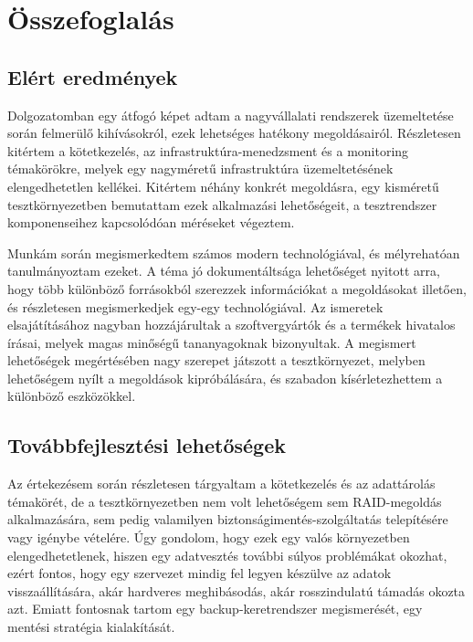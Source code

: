 
\chapter{Összefoglalás}

\section{Elért eredmények}
Dolgozatomban egy átfogó képet adtam a nagyvállalati rendszerek üzemeltetése során felmerülő kihívásokról, ezek lehetséges hatékony megoldásairól. Részletesen kitértem a kötetkezelés, az infrastruktúra-menedzsment és a monitoring témakörökre, melyek egy nagyméretű infrastruktúra üzemeltetésének elengedhetetlen kellékei. Kitértem néhány konkrét megoldásra, egy kisméretű tesztkörnyezetben bemutattam ezek alkalmazási lehetőségeit, a tesztrendszer komponenseihez kapcsolódóan méréseket végeztem.

Munkám során megismerkedtem számos modern technológiával, és mélyrehatóan tanulmányoztam ezeket. A téma jó dokumentáltsága lehetőséget nyitott arra, hogy több különböző forrásokból szerezzek információkat a megoldásokat illetően, és részletesen megismerkedjek egy-egy technológiával. Az ismeretek elsajátításához nagyban hozzájárultak a szoftvergyártók és a termékek hivatalos írásai, melyek magas minőségű tananyagoknak bizonyultak. A megismert lehetőségek megértésében nagy szerepet játszott a tesztkörnyezet, melyben lehetőségem nyílt a megoldások kipróbálására, és szabadon kísérletezhettem a különböző eszközökkel.

\section{Továbbfejlesztési lehetőségek}
Az értekezésem során részletesen tárgyaltam a kötetkezelés és az adattárolás témakörét, de a tesztkörnyezetben nem volt lehetőségem sem RAID-megoldás alkalmazására, sem pedig valamilyen biztonságimentés-szolgáltatás telepítésére vagy igénybe vételére. Úgy gondolom, hogy ezek egy valós környezetben elengedhetetlenek, hiszen egy adatvesztés további súlyos problémákat okozhat, ezért fontos, hogy egy szervezet mindig fel legyen készülve az adatok visszaállítására, akár hardveres meghibásodás, akár rosszindulatú támadás okozta azt. Emiatt fontosnak tartom egy backup-keretrendszer megismerését, egy mentési stratégia kialakítását.

